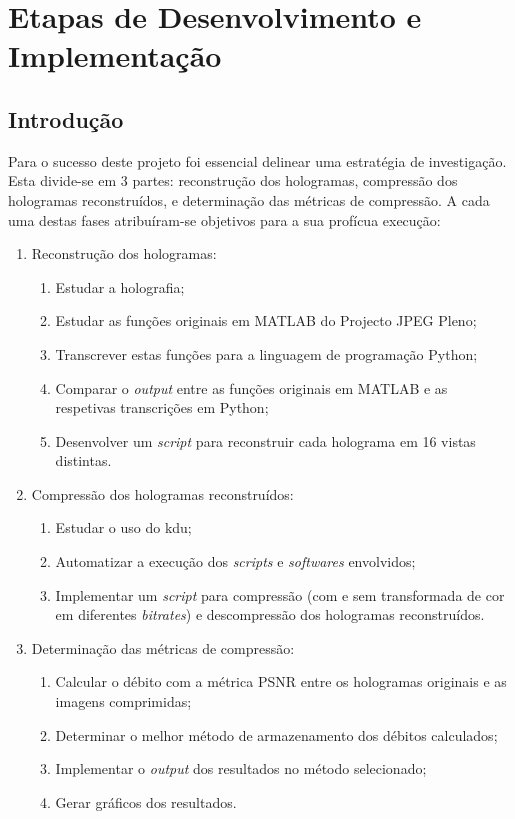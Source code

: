 \chapter{Etapas de Desenvolvimento e Implementação}
\label{ch::imp-test}

\section{Introdução}
\label{sec::imp-test:intro}

Para o sucesso deste projeto foi essencial delinear uma estratégia de investigação. Esta divide-se em 3 partes: reconstrução dos hologramas, compressão dos hologramas reconstruídos, e determinação das métricas de compressão. A cada uma destas fases atribuíram-se objetivos para a sua profícua execução:

\begin{enumerate}
    \item Reconstrução dos hologramas:
    \begin{enumerate}
        \item Estudar a holografia;
        \item Estudar as funções originais em MATLAB do Projecto JPEG Pleno;
        \item Transcrever estas funções para a linguagem de programação Python;
        \item Comparar o \textit{output} entre as funções originais em MATLAB e as respetivas transcrições em Python;
        \item Desenvolver um \textit{script} para reconstruir cada holograma em 16 vistas distintas.
    \end{enumerate}

    \item Compressão dos hologramas reconstruídos:
    \begin{enumerate}
        \item Estudar o uso do \ac{kdu};
        \item Automatizar a execução dos \textit{scripts} e \textit{softwares} envolvidos;
        \item Implementar um \textit{script} para compressão (com e sem transformada de cor em diferentes \textit{bitrates}) e descompressão dos hologramas reconstruídos.
    \end{enumerate}

    \item Determinação das métricas de compressão:
    \begin{enumerate}
        \item Calcular o débito com a métrica \ac{PSNR} entre os hologramas originais e as imagens comprimidas;
        \item Determinar o melhor método de armazenamento dos débitos calculados;
        \item Implementar o \textit{output} dos resultados no método selecionado;
        \item Gerar gráficos dos resultados.
    \end{enumerate}
\end{enumerate}

